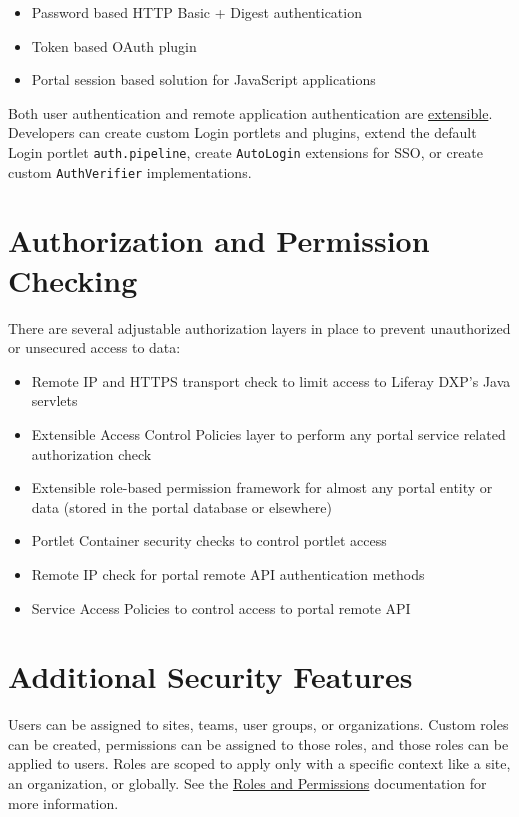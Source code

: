 \begin{itemize}
\tightlist
\item
  Password based HTTP Basic + Digest authentication
\item
  Token based OAuth plugin
\item
  Portal session based solution for JavaScript applications
\end{itemize}

Both user authentication and remote application authentication are
\href{/docs/7-2/frameworks/-/knowledge_base/f/authentication-pipelines}{extensible}.
Developers can create custom Login portlets and plugins, extend the
default Login portlet \texttt{auth.pipeline}, create \texttt{AutoLogin}
extensions for SSO, or create custom \texttt{AuthVerifier}
implementations.

\section{Authorization and Permission
Checking}\label{authorization-and-permission-checking}

There are several adjustable authorization layers in place to prevent
unauthorized or unsecured access to data:

\begin{itemize}
\tightlist
\item
  Remote IP and HTTPS transport check to limit access to Liferay DXP's
  Java servlets
\item
  Extensible Access Control Policies layer to perform any portal service
  related authorization check
\item
  Extensible role-based permission framework for almost any portal
  entity or data (stored in the portal database or elsewhere)
\item
  Portlet Container security checks to control portlet access
\item
  Remote IP check for portal remote API authentication methods
\item
  Service Access Policies to control access to portal remote API
\end{itemize}

\section{Additional Security
Features}\label{additional-security-features}

Users can be assigned to sites, teams, user groups, or organizations.
Custom roles can be created, permissions can be assigned to those roles,
and those roles can be applied to users. Roles are scoped to apply only
with a specific context like a site, an organization, or globally. See
the \href{/docs/7-1/user/-/knowledge_base/u/roles-and-permissions}{Roles
and Permissions} documentation for more information.

